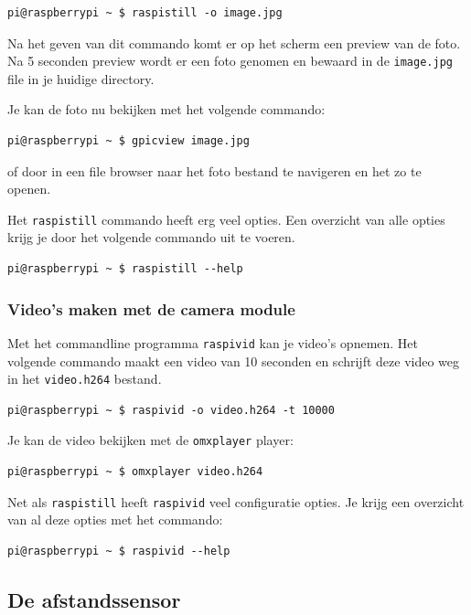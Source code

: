 \documentclass[a4paper]{article}
\begin{document}
\begin{lstlisting}
pi@raspberrypi ~ $ raspistill -o image.jpg
\end{lstlisting}

    Na het geven van dit commando komt er op het scherm een preview van
de foto.  Na 5 seconden preview wordt er een foto genomen en bewaard
in de \texttt{image.jpg} file in je huidige directory.

    Je kan de foto nu bekijken met het volgende commando:
\begin{lstlisting}
pi@raspberrypi ~ $ gpicview image.jpg
\end{lstlisting}
    of door in een file browser naar het foto bestand te navigeren en
het zo te openen.

    Het \texttt{raspistill} commando heeft erg veel opties.  Een
overzicht van alle opties krijg je door het volgende commando uit te
voeren.
\begin{lstlisting}
pi@raspberrypi ~ $ raspistill --help
\end{lstlisting}

    \subsubsection{Video's maken met de camera module}

      Met het commandline programma \texttt{raspivid} kan je video's
opnemen. Het volgende commando maakt een video van 10 seconden en
schrijft deze video weg in het \texttt{video.h264} bestand.
\begin{lstlisting}
pi@raspberrypi ~ $ raspivid -o video.h264 -t 10000
\end{lstlisting}

      Je kan de video bekijken met de \texttt{omxplayer} player:
\begin{lstlisting}
pi@raspberrypi ~ $ omxplayer video.h264
\end{lstlisting}

      Net als \texttt{raspistill} heeft \texttt{raspivid} veel
configuratie opties.  Je krijg een overzicht van al deze opties met
het commando:
\begin{lstlisting}
pi@raspberrypi ~ $ raspivid --help
\end{lstlisting}

  \subsection{De afstandssensor}
\end{document}

